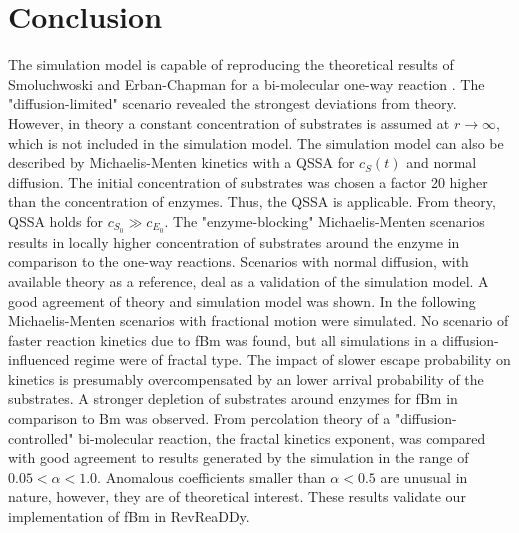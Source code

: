 \documentclass[
  a4paper,BCOR10mm,twoside,
  headsepline,footsepline,%
  fleqn,openbib
]{scrbook}
\begin{document}
\section{Conclusion}
The simulation model is capable of reproducing the theoretical results of Smoluchwoski and Erban-Chapman for a bi-molecular one-way reaction . The "diffusion-limited" scenario revealed the strongest deviations from theory.  However, in theory a constant concentration of substrates is assumed at $r\rightarrow \infty$, which is not included in the simulation model. The simulation model can also be described by Michaelis-Menten kinetics with a QSSA for $c_S(t)$ and normal diffusion. The initial concentration of substrates was chosen a factor 20 higher than the concentration of enzymes. Thus, the QSSA is applicable. From theory, QSSA holds for $c_{S_0}\gg c_{E_0}$. The "enzyme-blocking" Michaelis-Menten scenarios results in locally higher concentration of substrates around the enzyme in comparison to the one-way reactions. Scenarios with normal diffusion, with available theory as a reference, deal as a validation of the simulation model. A good agreement of theory and simulation model was shown. In the following Michaelis-Menten  scenarios with fractional motion were simulated. No scenario of faster reaction kinetics due to fBm was found, but all simulations in a diffusion-influenced regime were of fractal type. The impact of slower escape probability on kinetics is presumably overcompensated by an lower arrival probability of the substrates.  A stronger depletion of substrates around enzymes for fBm in comparison to Bm was observed. From percolation theory of a "diffusion-controlled" bi-molecular reaction, the fractal kinetics exponent, was compared with good agreement to results generated by the simulation in the range of $0.05<\alpha<1.0$. Anomalous coefficients smaller than $\alpha<0.5$ are unusual in nature, however, they are of theoretical interest. These results validate our implementation of fBm in RevReaDDy. 

\end{document}
